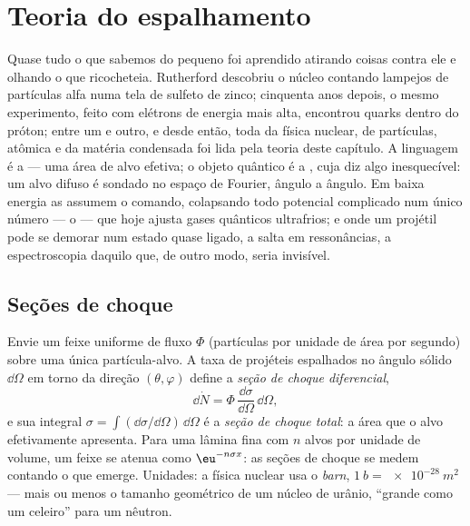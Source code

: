 \chapter{Teoria do espalhamento}\label{ch:b3:scattering-theory}

Quase tudo o que sabemos do pequeno foi aprendido atirando coisas
contra ele e olhando o que ricocheteia. Rutherford descobriu o núcleo
contando lampejos de partículas alfa numa tela de sulfeto de zinco;
cinquenta anos depois, o mesmo experimento, feito com elétrons de
energia mais alta, encontrou quarks dentro do próton; entre um e outro,
e desde então, toda  da física nuclear, de partículas,
atômica e da matéria condensada foi lida pela teoria deste capítulo. A
linguagem é a \emph{} --- uma área de alvo efetiva; o
objeto quântico é a \emph{}, cuja  diz algo inesquecível: um alvo difuso é sondado no espaço de
Fourier, ângulo a ângulo. Em baixa energia as  assumem o
comando, colapsando todo potencial complicado num único número --- o
 --- que hoje ajusta gases quânticos
ultrafrios; e onde um projétil pode se demorar num estado quase ligado,
a  salta em ressonâncias, a espectroscopia daquilo que,
de outro modo, seria invisível.

\section{Seções de choque}

\begin{definition}\label{def:b3:scattering-theory:cross-section}
Envie um feixe uniforme de fluxo $\Phi$ (partículas por unidade de área
por segundo) sobre uma única partícula-alvo. A taxa de projéteis
espalhados no ângulo sólido $\dd\Omega$ em torno da direção $(\theta,
\varphi)$ define a \emph{seção de choque diferencial},
\[
\dd\dot N = \Phi\,\frac{\dd\sigma}{\dd\Omega}\,\dd\Omega ,
\]
e sua integral $\sigma = \int(\dd\sigma/\dd\Omega)\,\dd\Omega$ é a
\emph{seção de choque total}: a área que o alvo efetivamente
apresenta. Para uma lâmina fina com $n$ alvos por unidade de volume, um
feixe se atenua como $\eu^{-n\sigma x}$: as seções de choque se medem
contando o que emerge. Unidades: a física nuclear usa o \emph{barn},
$\qty{1}{b} = \qty{e-28}{m^2}$ --- mais ou menos o tamanho geométrico
de um núcleo de urânio, ``grande como um celeiro'' para um nêutron.
\end{definition}


